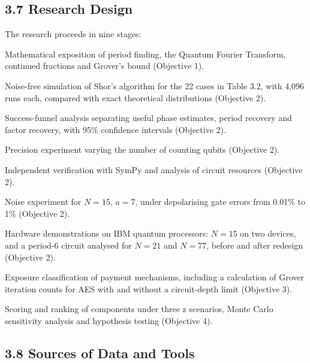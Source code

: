 \documentclass[12pt,oneside]{report}
\begin{document}
\subsection*{3.7 Research Design}

The research proceeds in nine stages:
\par

Mathematical exposition of period finding, the Quantum Fourier Transform, continued fractions and Grover's bound (Objective 1).
\par

Noise-free simulation of Shor's algorithm for the 22 cases in Table 3.2, with 4,096 runs each, compared with exact theoretical distributions (Objective 2).
\par

Success-funnel analysis separating useful phase estimates, period recovery and factor recovery, with 95\% confidence intervals (Objective 2).
\par

Precision experiment varying the number of counting qubits (Objective 2).
\par

Independent verification with SymPy and analysis of circuit resources (Objective 2).
\par

Noise experiment for $N = 15$, $a = 7$, under depolarising gate errors from 0.01\% to 1\% (Objective 2).
\par

Hardware demonstrations on IBM quantum processors: $N = 15$ on two devices, and a period-6 circuit analysed for $N = 21$ and $N = 77$, before and after redesign (Objective 2).
\par

Exposure classification of payment mechanisms, including a calculation of Grover iteration counts for AES with and without a circuit-depth limit (Objective 3).
\par

Scoring and ranking of components under three z scenarios, Monte Carlo sensitivity analysis and hypothesis testing (Objective 4).
\par

\subsection*{3.8 Sources of Data and Tools}
\end{document}

